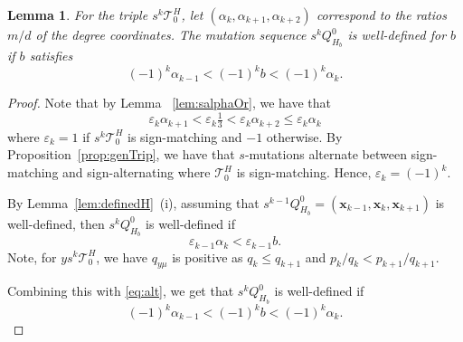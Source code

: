 \documentclass[11pt, reqno]{amsart}
\newtheorem{lemma}[thm]{Lemma}
\theoremstyle{remark}
\numberwithin{equation}{subsection}
\numberwithin{figure}{section}
\theoremstyle{customremark}
\newcommand{\Tt}{\mathcal{T}}
\newcommand{\al}{{\alpha}}
\newcommand{\eps}{\varepsilon}
\begin{document}
\begin{lemma} \label{lem:sMutDefinedH}
    For the triple $s^k\Tt_0^H$, let $(\al_k,\al_{k+1},\al_{k+2})$ correspond to the ratios $m/d$ of the degree coordinates. The mutation sequence $s^kQ_{H_b}^0$ is well-defined for $b$ if $b$ satisfies
    \[ (-1)^{k}\al_{k-1} < (-1)^{k} b < (-1)^{k}\al_{k} .\]
\end{lemma}
\begin{proof}
 Note that by Lemma ~\ref{lem:salphaOr}, we have that 
	\begin{equation}\label{eq:alt}
	    \eps_k\al_{k+1} <\eps_k \tfrac13 < \eps_k \al_{k+2} \leq \eps_k\al_{k}
	\end{equation}  
    where $\eps_{k}=1$ if $s^{k}\Tt_0^H$ is sign-matching and $-1$ otherwise. By Proposition~\ref{prop:genTrip}, we have that $s$-mutations alternate between sign-matching and sign-alternating where $\Tt_0^H$ is sign-matching. Hence, $\eps_{k}=(-1)^{k}.$ 

    
    By Lemma~\ref{lem:definedH}~(i), assuming that $s^{k-1}Q_{H_b}^0=(\bm{x}_{k-1},\bm{x}_k,\bm{x}_{k+1})$ is well-defined, then $s^kQ_{H_b}^0$ is well-defined if  
    \[ \eps_{k-1} \al_{k} <\eps_{k-1} b.\] Note, for $ys^k\Tt_0^H$, we have $q_{y\mu}$ is positive as $q_k\leq q_{k+1}$ and $p_k/q_k<p_{k+1}/q_{k+1}$. 
    
 Combining this with \eqref{eq:alt}, we get that $s^kQ_{H_b}^0$ is well-defined if 
  \[ (-1)^{k}\al_{k-1} <  (-1)^{k} b < (-1)^{k}\al_{k} .\]
\end{proof}
\end{document}
